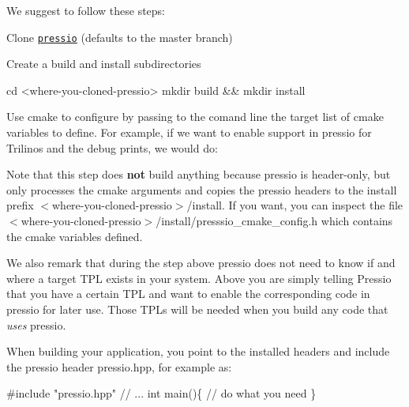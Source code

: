 We suggest to follow these steps\+: 
\begin{DoxyEnumerate}
\item Clone \href{https://github.com/Pressio/pressio}{\tt pressio} (defaults to the master branch)


\item Create a build and install subdirectories 


\begin{DoxyCode}
cd <where-you-cloned-pressio>
mkdir build && mkdir install
\end{DoxyCode}
 


\item Use cmake to configure by passing to the comand line the target list of cmake variables to define. For example, if we want to enable support in {\ttfamily pressio} for Trilinos and the debug prints, we would do\+: 


 

Note that this step does {\bfseries not} build anything because {\ttfamily pressio} is header-\/only, but only processes the cmake arguments and copies the pressio headers to the install prefix {\ttfamily $<$where-\/you-\/cloned-\/pressio$>$/install}. If you want, you can inspect the file {\ttfamily $<$where-\/you-\/cloned-\/pressio$>$/install/presssio\+\_\+cmake\+\_\+config.h} which contains the cmake variables defined.

We also remark that during the step above pressio does not need to know if and where a target T\+PL exists in your system. Above you are simply telling Pressio that you have a certain T\+PL and want to enable the corresponding code in pressio for later use. Those T\+P\+Ls will be needed when you build any code that {\itshape uses} pressio.


\item When building your application, you point to the installed headers and include the {\ttfamily pressio} header {\ttfamily pressio.\+hpp}, for example as\+: 


\begin{DoxyCode}
\textcolor{preprocessor}{#include "pressio.hpp"}
\textcolor{comment}{// ...}
\textcolor{keywordtype}{int} main()\{
  \textcolor{comment}{// do what you need}
\}
\end{DoxyCode}
  
\end{DoxyEnumerate}



